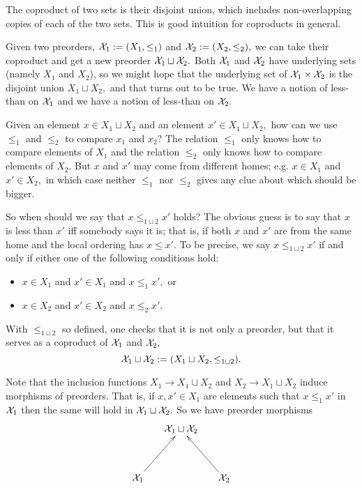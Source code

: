 \documentclass[../main/CT4S-EN-RU]{subfiles}
\begin{document}
\begin{exampleRUS}\label{ex:[1]x[1]}
\end{exampleRUS}


\subsubsection{}

\begin{blockENG}
The coproduct of two sets is their disjoint union, which includes non-overlapping copies of each of the two sets. This is good intuition for coproducts in general.
\end{blockENG}

\begin{blockRUS}
\end{blockRUS}

\begin{exampleENG}
Given two preorders, $\mathcal{X}_1:=(X_1,\leq_1)$ and $\mathcal{X}_2:=(X_2,\leq_2),$ we can take their coproduct and get a new preorder $\mathcal{X}_1\sqcup\mathcal{X}_2.$ Both $\mathcal{X}_1$ and $\mathcal{X}_2$ have underlying sets (namely $X_1$ and $X_2$), so we might hope that the underlying set of $\mathcal{X}_1\times\mathcal{X}_2$ is the disjoint union $X_1\sqcup X_2,$ and that turns out to be true. We have a notion of less-than on $\mathcal{X}_1$ and we have a notion of less-than on $\mathcal{X}_2.$ 

Given an element $x\in X_1\sqcup X_2$ and an element $x'\in X_1\sqcup X_2,$ how can we use $\leq_1$ and $\leq_2$ to compare $x_1$ and $x_2?$ The relation $\leq_1$ only knows how to compare elements of $X_1$ and the relation $\leq_2$ only knows how to compare elements of $X_2.$ But $x$ and $x'$ may come from different homes; e.g. $x\in X_1$ and $x'\in X_2,$ in which case neither $\leq_1$ nor $\leq_2$ gives any clue about which should be bigger. 

So when should we say that $x\leq_{1\sqcup 2} x'$ holds? The obvious guess is to say that $x$ is less than $x'$ iff somebody says it is; that is, if both $x$ and $x'$ are from the same home and the local ordering has $x\leq x'.$ To be precise, we say $x\leq_{1\sqcup 2}x'$ if and only if either one of the following conditions hold:
\begin{itemize}
\item $x\in X_1$ and $x'\in X_1$ and $x\leq_1x',$ or
\item $x\in X_2$ and $x'\in X_2$ and $x\leq_2x'.$
\end{itemize}
With $\leq_{1\sqcup 2}$ so defined, one checks that it is not only a preorder, but that it serves as a coproduct of $\mathcal{X}_1$ and $\mathcal{X}_2,$ 
$$\mathcal{X}_1\sqcup\mathcal{X}_2:=(X_1\sqcup X_2,\leq_{1\sqcup 2}).$$

Note that the inclusion functions $X_1\to X_1\sqcup X_2$ and $X_2\to X_1\sqcup X_2$ induce morphisms of preorders. That is, if $x,x'\in X_1$ are elements such that $x\leq_1x'$ in $\mathcal{X}_1$ then the same will hold in $\mathcal{X}_1\sqcup\mathcal{X}_2.$ So we have preorder morphisms
$$\xymatrix@=15pt{&\mcX_1\sqcup\mcX_2\\\\\mcX_1\ar[ruu]&&\mcX_2\ar[luu]}$$
\end{exampleENG}
\end{document}

